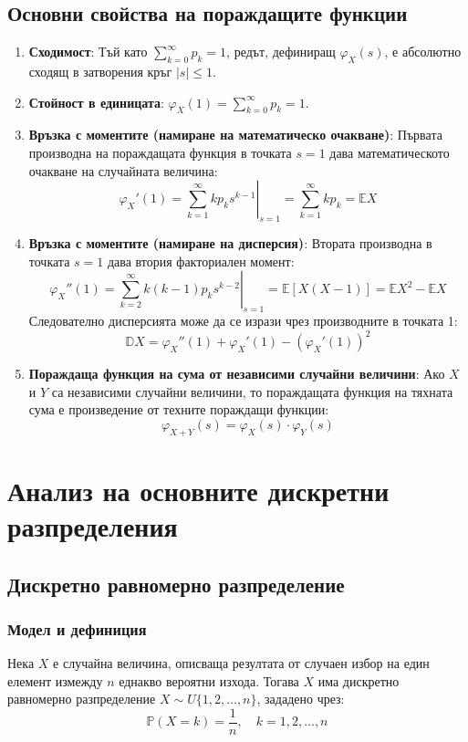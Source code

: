 \documentclass{scrartcl}
\begin{document}
\begin{FlushLeft}
\subsection{Основни свойства на пораждащите функции}
\begin{enumerate}
    \item \textbf{Сходимост}: Тъй като $\sum_{k=0}^{\infty} p_k = 1$, редът, дефиниращ $\varphi_X(s)$, е абсолютно сходящ в затворения кръг $|s| \le 1$.
    \item \textbf{Стойност в единицата}: $\varphi_X(1) = \sum_{k=0}^{\infty} p_k = 1$.
    \item \textbf{Връзка с моментите (намиране на математическо очакване)}: Първата производна на пораждащата функция в точката $s=1$ дава математическото очакване на случайната величина:
    \[ \varphi_X'(1) = \left. \sum_{k=1}^{\infty} k p_k s^{k-1} \right|_{s=1} = \sum_{k=1}^{\infty} k p_k = \mathbb{E}X \]
    \item \textbf{Връзка с моментите (намиране на дисперсия)}: Втората производна в точката $s=1$ дава втория факториален момент:
    \[ \varphi_X''(1) = \left. \sum_{k=2}^{\infty} k(k-1) p_k s^{k-2} \right|_{s=1} = \mathbb{E}[X(X-1)] = \mathbb{E}X^2 - \mathbb{E}X \]
    Следователно дисперсията може да се изрази чрез производните в точката 1:
    \[ \mathbb{D}X = \varphi_X''(1) + \varphi_X'(1) - (\varphi_X'(1))^2 \]
    \item \textbf{Пораждаща функция на сума от независими случайни величини}: Ако $X$ и $Y$ са независими случайни величини, то пораждащата функция на тяхната сума е произведение от техните пораждащи функции:
    \[ \varphi_{X+Y}(s) = \varphi_X(s) \cdot \varphi_Y(s) \]
\end{enumerate}

\section{Анализ на основните дискретни разпределения}

\subsection{Дискретно равномерно разпределение}
\subsubsection{Модел и дефиниция}
Нека $X$ е случайна величина, описваща резултата от случаен избор на един елемент измежду $n$ еднакво вероятни изхода. Тогава $X$ има дискретно равномерно разпределение $X \sim U\{1, 2, \dots, n\}$, зададено чрез:
\[ \mathbb{P}(X = k) = \frac{1}{n}, \quad k = 1, 2, \dots, n \]


\end{FlushLeft}
\end{document}
